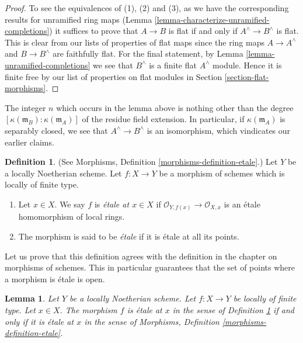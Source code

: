 \documentclass{stacks-project}
\theoremstyle{plain}
\newtheorem{lemma}[subsection]{Lemma}
\theoremstyle{definition}
\newtheorem{definition}[subsection]{Definition}
\theoremstyle{remark}
\numberwithin{equation}{subsection}
\begin{document}
\begin{proof}
To see the equivalences of (1), (2) and (3), as we have the corresponding
results for unramified ring maps
(Lemma \ref{lemma-characterize-unramified-completions})
it suffices to prove that
$A \to B$ is flat if and only if $A^\wedge \to B^\wedge$ is flat.
This is clear from our lists of properties of flat maps since
the ring maps $A \to A^\wedge$ and $B \to B^\wedge$ are faithfully flat.
For the final statement, by Lemma \ref{lemma-unramified-completions}
we see that $B^\wedge$ is a finite flat $A^\wedge$ module.
Hence it is finite free by our list
of properties on flat modules in Section \ref{section-flat-morphisms}.
\end{proof}

\noindent
The integer $n$ which occurs in the lemma above
is nothing other than the degree
$[\kappa(\mathfrak m_B) : \kappa(\mathfrak m_A)]$ of the residue field
extension. In particular, if $\kappa(\mathfrak m_A)$
is separably closed, we see that $A^\wedge \to B^\wedge$
is an isomorphism, which vindicates our earlier claims.

\begin{definition}
\label{definition-etale-schemes-1}
(See Morphisms, Definition \ref{morphisms-definition-etale}.)
Let $Y$ be a locally Noetherian scheme.
Let $f : X \to Y$ be a morphism of schemes which is locally of finite type.
\begin{enumerate}
\item Let $x \in X$. We say $f$ is {\it \'etale at $x \in X$} if
$\mathcal{O}_{Y, f(x)} \to \mathcal{O}_{X, x}$ is an
\'etale homomorphism of local rings.
\item The morphism is said to be {\it \'etale} if it is \'etale at all its
points.
\end{enumerate}
\end{definition}

\noindent
Let us prove that this definition agrees with the definition in the
chapter on morphisms of schemes. This in particular guarantees that the
set of points where a morphism is \'etale is open.

\begin{lemma}
\label{lemma-etale-definition}
Let $Y$ be a locally Noetherian scheme.
Let $f : X \to Y$ be locally of finite type.
Let $x \in X$. The morphism $f$ is \'etale at $x$ in
the sense of Definition \ref{definition-etale-schemes-1}
if and only if it is \'etale at $x$ in
the sense of Morphisms, Definition \ref{morphisms-definition-etale}.
\end{lemma}
\end{document}
